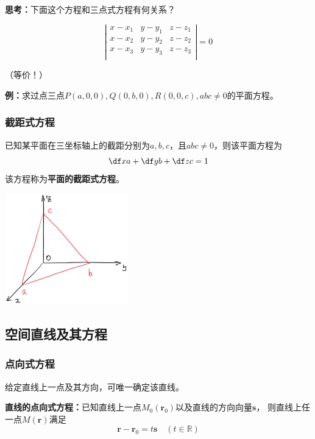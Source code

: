 {\bf 思考：}下面这个方程和三点式方程有何关系？

$$\left|\begin{array}{ccc}
x-x_1 & y-y_1 & z-z_1\\
x-x_2 & y-y_2 & z-z_2\\
x-x_3 & y-y_3 & z-z_3\\
\end{array}\right|
=0
$$

\hfill （等价！）

{\bf 例：}求过点三点$P(a,0,0),Q(0,b,0),R(0,0,c),abc\ne0$的平面方程。

\subsubsection{截距式方程}

\begin{thx}
	已知某平面在三坐标轴上的截距分别为$a,b,c$，且$abc\ne 0$，则该平面方程为
	$$\df xa+\df yb+\df zc=1$$
	该方程称为{\bf 平面的截距式方程}。
\end{thx}

\begin{center}
	\includegraphics[width=0.4\textwidth]{./images/ch8/pabc.jpg}
\end{center}

\subsection{空间直线及其方程}

\subsubsection{点向式方程}

给定直线上一点及其方向，可唯一确定该直线。

\begin{thx}
	{\bf 直线的点向式方程：}已知直线上一点$M_0(\bm{r}_0)$以及直线的方向向量$\bm{s}$，
	则直线上任一点$M(\bm{r})$满足 
	$${\bm{r}-\bm{r}_0=t\bm{s}\quad(t\in\mathbb{R})}$$ 
\end{thx}


